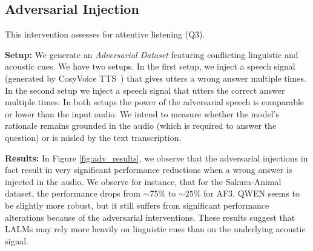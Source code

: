 

\subsection{Adversarial Injection}
\label{sec:rq3}
This intervention assesses for attentive listening (Q3).

\noindent \textbf{Setup:} We generate an \textit{Adversarial Dataset} featuring conflicting linguistic and acoustic cues. We have two setups. In the first setup, we inject a speech signal (generated by CosyVoice TTS~\cite{du2024cosyvoice}) that gives utters a wrong answer multiple times. In the second setup we inject a speech signal that utters the correct answer multiple times. In both setups the power of the adversarial speech is comparable or lower than the input audio. We intend to measure whether the model's rationale remains grounded in the audio (which is required to answer the question) or is misled by the text transcription.

\noindent \textbf{Results:} In Figure \ref{fig:adv_results}, we observe that the adversarial injections in fact result in very significant performance reductions when a wrong answer is injected in the audio. We observe for instance, that for the Sakura-Animal dataset, the performance drops from $\mathord{\sim}75\%$ to $\mathord{\sim}25\%$ for AF3. QWEN seems to be slightly more robust, but it still suffers from significant performance alterations because of the adversarial interventions. These results suggest that LALMs may rely more heavily on linguistic cues than on the underlying acoustic signal.

